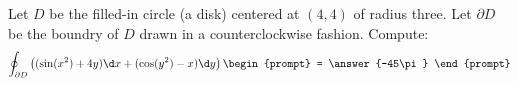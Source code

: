 \documentclass{ximera}
\begin{document}
\begin{exercise}
  Let $D$ be the filled-in circle (a disk) centered at $(4,4)$ of
  radius three.  Let $\partial D$ be the boundry of $D$ drawn in a
  counterclockwise fashion. Compute:
  \[
  \oint_{\partial D} \left( (\sin(x^2)+4y)\d x + (\cos(y^2)-x)\d y\right)
  \begin{prompt}
    = \answer{-45\pi}
  \end{prompt}
  \]
\end{exercise}
\end{document}
